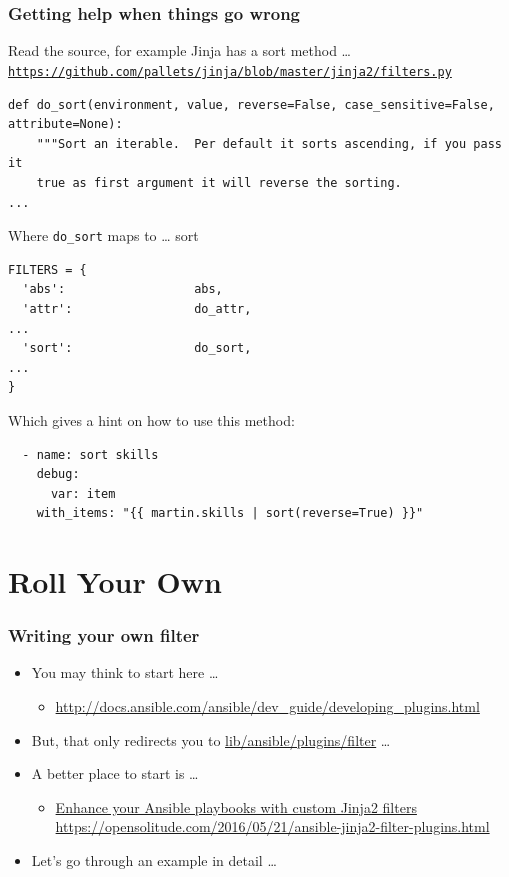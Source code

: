 \documentclass[pdf]{beamer}
\begin{document}
\begin{frame}[fragile]
  \frametitle{Getting help when things go wrong}
  Read the source, for example Jinja has a sort method \ldots \newline
  \texttt{
    \tiny \url{https://github.com/pallets/jinja/blob/master/jinja2/filters.py}
  }
  \begin{lstlisting}
def do_sort(environment, value, reverse=False, case_sensitive=False, attribute=None):
    """Sort an iterable.  Per default it sorts ascending, if you pass it
    true as first argument it will reverse the sorting.
...
  \end{lstlisting}
  Where \texttt{do\_sort} maps to \ldots \pause{} sort
  \begin{lstlisting}
FILTERS = {
  'abs':                  abs,
  'attr':                 do_attr, 
...
  'sort':                 do_sort,
...
}
  \end{lstlisting}
  \pause{}
  Which gives a hint on how to use this method:
  \begin{lstlisting}
  - name: sort skills
    debug:
      var: item
    with_items: "{{ martin.skills | sort(reverse=True) }}"
  \end{lstlisting}
\end{frame}

\section{Roll Your Own}

\begin{frame}
  \frametitle{Writing your own filter}
  \begin{itemize}[<+->]
    \item[] You may think to start here \ldots
      \begin{itemize}
        \item<1-> \small \url{http://docs.ansible.com/ansible/dev_guide/developing_plugins.html}
      \end{itemize}
    \item[] But, that only redirects you to \href{https://github.com/ansible/ansible/blob/devel/lib/ansible/plugins/filter/core.py}{lib/ansible/plugins/filter} \ldots
    \item[] A better place to start is \ldots
      \begin{itemize}
        \item
          \href{https://opensolitude.com/2016/05/21/ansible-jinja2-filter-plugins.html}{Enhance
          your Ansible playbooks with custom Jinja2 filters} \newline
        \small \url{https://opensolitude.com/2016/05/21/ansible-jinja2-filter-plugins.html}
      \end{itemize}
    \item[] Let's go through an example in detail \ldots
  \end{itemize}
\end{frame}
\end{document}
